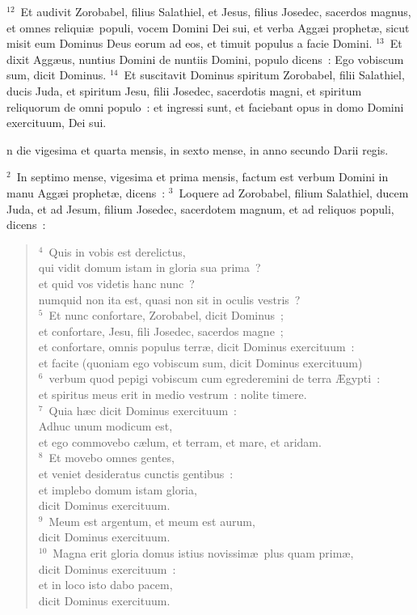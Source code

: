 ${}^{12}$~Et audivit Zorobabel, filius Salathiel, et Jesus, filius Josedec, sacerdos magnus, et omnes reliqui\ae\ populi, vocem Domini Dei sui, et verba Agg\ae i prophet\ae , sicut misit eum Dominus Deus eorum ad eos, et timuit populus a facie Domini.
${}^{13}$~Et dixit Agg\ae us, nuntius Domini de nuntiis Domini, populo dicens~: Ego vobiscum sum, dicit Dominus.
${}^{14}$~Et suscitavit Dominus spiritum Zorobabel, filii Salathiel, ducis Juda, et spiritum Jesu, filii Josedec, sacerdotis magni, et spiritum reliquorum de omni populo~: et ingressi sunt, et faciebant opus in domo Domini exercituum, Dei sui.

\bchapter
{}n die vigesima et quarta mensis, in sexto mense, in anno secundo Darii regis.


${}^{2}$~In septimo mense, vigesima et prima mensis, factum est verbum Domini in manu Agg\ae i prophet\ae , dicens~:
${}^{3}$~Loquere ad Zorobabel, filium Salathiel, ducem Juda, et ad Jesum, filium Josedec, sacerdotem magnum, et ad reliquos populi, dicens~:
\begin{verse}${}^{4}$~Quis in vobis est derelictus,\\ qui vidit domum istam in gloria sua prima~?\\ et quid vos videtis hanc nunc~?\\ numquid non ita est, quasi non sit in oculis vestris~?\\
${}^{5}$~Et nunc confortare, Zorobabel, dicit Dominus~;\\ et confortare, Jesu, fili Josedec, sacerdos magne~;\\ et confortare, omnis populus terr\ae , dicit Dominus exercituum~:\\ et facite (quoniam ego vobiscum sum, dicit Dominus exercituum)\\
${}^{6}$~verbum quod pepigi vobiscum cum egrederemini de terra \AE gypti~:\\ et spiritus meus erit in medio vestrum~: nolite timere.\\
${}^{7}$~Quia h\ae c dicit Dominus exercituum~:\\ Adhuc unum modicum est,\\ et ego commovebo c\ae lum, et terram, et mare, et aridam.\\
${}^{8}$~Et movebo omnes gentes,\\ et veniet desideratus cunctis gentibus~:\\ et implebo domum istam gloria,\\ dicit Dominus exercituum.\\
${}^{9}$~Meum est argentum, et meum est aurum,\\ dicit Dominus exercituum.\\
${}^{10}$~Magna erit gloria domus istius novissim\ae\ plus quam prim\ae ,\\ dicit Dominus exercituum~:\\ et in loco isto dabo pacem,\\ dicit Dominus exercituum.\end{verse}


